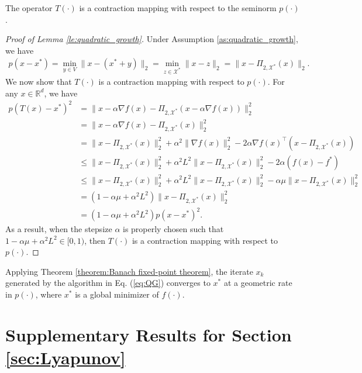 \documentclass[11 pt]{article}
\begin{document}
	\begin{lemma}\label{le:quadratic_growth}
		The operator $T(\cdot)$ is a contraction mapping with respect to the seminorm $p(\cdot)$.
	\end{lemma}
	\begin{proof}[Proof of Lemma \ref{le:quadratic_growth}]
		Under Assumption \ref{as:quadratic_growth}, we have 
		\begin{align*}
			p(x-x^*) = \min_{y \in V} \| x- (x^* + y) \|_2 = \min_{z \in \mathcal{X}^*} \| x-z \|_2 = \| x - \Pi_{2,\mathcal{X}^*}(x) \|_2.
		\end{align*}
		We now show that $T(\cdot)$ is a contraction mapping with respect to $p(\cdot)$. For any $x \in \mathbb{R}^d$, we have
		\begin{align*}
			p\left(T(x) - x^* \right)^2 &=\| x - \alpha\nabla f(x)  - \Pi_{2,\mathcal{X}^*}\left(x - \alpha\nabla f(x) \right) \|^2_2 \\
			&= \| x - \alpha \nabla f(x) - \Pi_{2,\mathcal{X}^*} (x)  \|^2_2 \\
			&= \| x - \Pi_{2,\mathcal{X}^*} (x) \|^2_2 + \alpha^2 \| \nabla f(x) \|^2_2 - 2\alpha \nabla f(x)^\top \left(x - \Pi_{2,\mathcal{X}^*} (x)\right)\\
			&\leq \| x - \Pi_{2,\mathcal{X}^*} (x) \|^2_2 + \alpha^2 L^2 \| x - \Pi_{2,\mathcal{X}^*} (x)  \|^2_2 - 2\alpha \left(f(x) - f^*\right)\\
			&\leq \| x - \Pi_{2,\mathcal{X}^*} (x) \|^2_2 + \alpha^2 L^2 \| x - \Pi_{2,\mathcal{X}^*} (x)  \|^2_2 - \alpha \mu \| x - \Pi_{2,\mathcal{X}^*} (x) \|^2_2\\
			&= \left(1 - \alpha \mu + \alpha^2 L^2 \right)\| x - \Pi_{2,\mathcal{X}^*} (x) \|^2_2\\
			&=\left(1 - \alpha \mu + \alpha^2 L^2 \right) p(x-x^*)^2.
		\end{align*}
		As a result, when the stepsize $\alpha$ is properly chosen such that $1 - \alpha \mu + \alpha^2 L^2 \in [0,1)$, then $T(\cdot)$ is a contraction mapping with respect to $p(\cdot)$. \end{proof}
	
	Applying Theorem \ref{theorem:Banach fixed-point theorem}, the iterate $x_k$ generated by the algorithm in Eq. (\ref{eq:QG}) converges to $x^*$ at a geometric rate in $p(\cdot)$, where $x^*$ is a global minimizer of $f(\cdot)$. 
	
	\section{Supplementary Results for Section \ref{sec:Lyapunov}}
	
\end{document}
